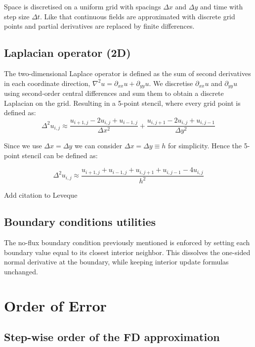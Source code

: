 \documentclass[
  letterpaper,
  DIV=11,
  numbers=noendperiod]{scrartcl}
\begin{document}
Space is discretised on a uniform grid with spacings \(\Delta x\) and
\(\Delta y\) and time with step size \(\Delta t\). Like that continuous
fields are approximated with discrete grid points and partial
derivatives are replaced by finite differences.

\subsection{Laplacian operator (2D)}\label{laplacian-operator-2d}

The two-dimensional Laplace operator is defined as the sum of second
derivatives in each coordinate direction,
\(\nabla^2 u = \partial_{xx}u + \partial_{yy}u.\) We discretise
\(\partial_{xx}u\) and \(\partial_{yy}u\) using second-order central
differences and sum them to obtain a discrete Laplacian on the grid.
Resulting in a 5-point stencil, where every grid point is defined as:
\[ \Delta^2u_{i,j} \approx \frac{u_{i+1,j}-2u_{i,j}+u_{i-1,j}}{\Delta x^2}+\frac{u_{i,j+1}-2u_{i,j}+u_{i,j-1}}{\Delta y^2} \]

Since we use \(\Delta x = \Delta y\) we can consider
\(\Delta x = \Delta y \equiv h\) for simplicity. Hence the 5-point
stencil can be defined as:

\[ \Delta^2u_{i,j} \approx \frac{u_{i+1,j}+u_{i-1,j}+ u_{i,j+1}+u_{i,j-1}-4u_{i,j}}{h^2} \]

Add citation to Leveque

\subsection{Boundary conditions
utilities}\label{boundary-conditions-utilities}

The no-flux boundary condition previously mentioned is enforced by
setting each boundary value equal to its closest interior neighbor. This
dissolves the one-sided normal derivative at the boundary, while keeping
interior update formulas unchanged.

\section{Order of Error}\label{order-of-error}

\subsection{Step-wise order of the FD
approximation}\label{step-wise-order-of-the-fd-approximation}
\end{document}

